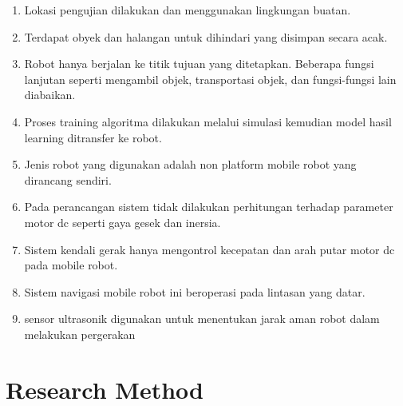 \begin{enumerate}
	\item Lokasi pengujian dilakukan dan menggunakan lingkungan buatan.
	\item Terdapat obyek dan halangan untuk dihindari yang disimpan secara acak.
	\item Robot hanya berjalan ke titik tujuan yang ditetapkan. Beberapa fungsi lanjutan seperti mengambil objek, transportasi objek, dan fungsi-fungsi lain diabaikan.
	\item Proses training algoritma dilakukan melalui simulasi kemudian model hasil learning ditransfer ke robot.
	\item Jenis robot yang digunakan adalah non platform mobile robot yang dirancang sendiri.
	\item Pada perancangan sistem tidak dilakukan perhitungan terhadap parameter motor dc seperti gaya gesek dan inersia.
	\item Sistem kendali gerak hanya mengontrol kecepatan dan arah putar motor dc pada mobile robot.
	\item Sistem navigasi mobile robot ini beroperasi pada lintasan yang datar.
	\item sensor ultrasonik digunakan untuk menentukan jarak aman robot dalam melakukan pergerakan
\end{enumerate}


\section{Research Method}

